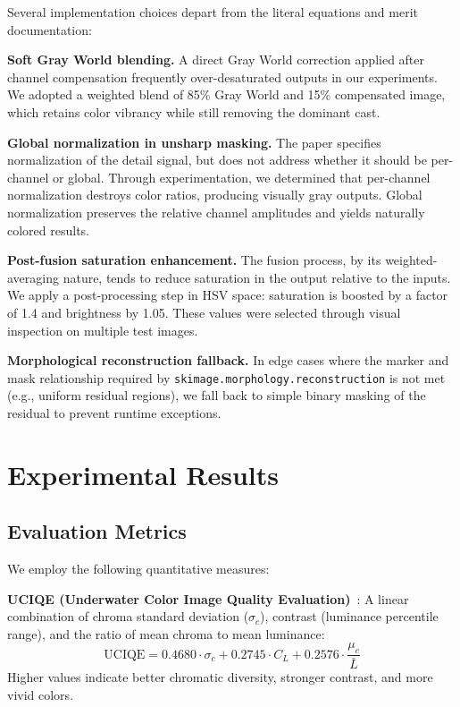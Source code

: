 \documentclass[conference]{IEEEtran}
\begin{document}
Several implementation choices depart from the literal equations and merit documentation:

\textbf{Soft Gray World blending.} A direct Gray World correction applied after channel compensation frequently over-desaturated outputs in our experiments. We adopted a weighted blend of 85\% Gray World and 15\% compensated image, which retains color vibrancy while still removing the dominant cast.

\textbf{Global normalization in unsharp masking.} The paper specifies normalization of the detail signal, but does not address whether it should be per-channel or global. Through experimentation, we determined that per-channel normalization destroys color ratios, producing visually gray outputs. Global normalization preserves the relative channel amplitudes and yields naturally colored results.

\textbf{Post-fusion saturation enhancement.} The fusion process, by its weighted-averaging nature, tends to reduce saturation in the output relative to the inputs. We apply a post-processing step in HSV space: saturation is boosted by a factor of 1.4 and brightness by 1.05. These values were selected through visual inspection on multiple test images.

\textbf{Morphological reconstruction fallback.} In edge cases where the marker and mask relationship required by \texttt{skimage.morphology.reconstruction} is not met (e.g., uniform residual regions), we fall back to simple binary masking of the residual to prevent runtime exceptions.


\section{Experimental Results}

\subsection{Evaluation Metrics}

We employ the following quantitative measures:

\textbf{UCIQE (Underwater Color Image Quality Evaluation)}~\cite{yang2015uciqe}: A linear combination of chroma standard deviation ($\sigma_c$), contrast (luminance percentile range), and the ratio of mean chroma to mean luminance:
\begin{equation}
    \text{UCIQE} = 0.4680 \cdot \sigma_c + 0.2745 \cdot C_L + 0.2576 \cdot \frac{\mu_c}{\bar{L}}
\end{equation}
Higher values indicate better chromatic diversity, stronger contrast, and more vivid colors.
\end{document}
